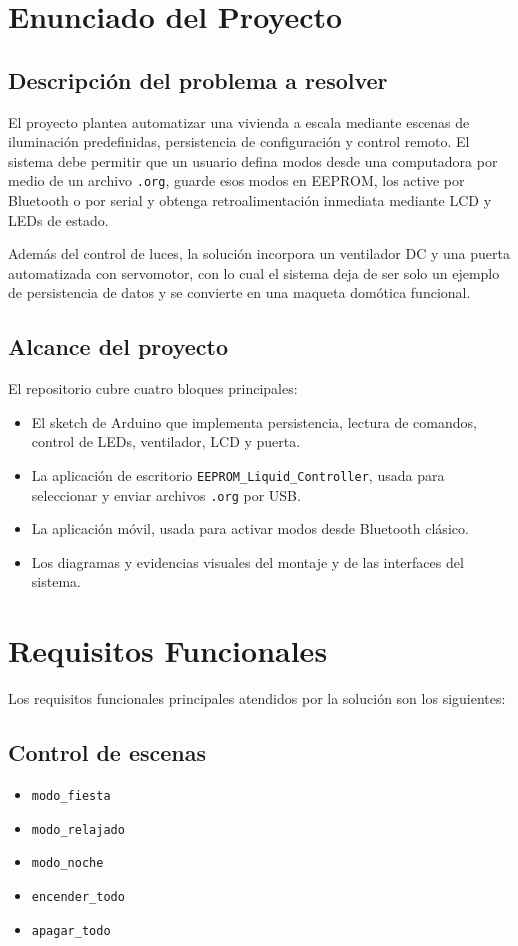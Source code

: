 \documentclass[12pt,a4paper]{article}
\begin{document}
\section{Enunciado del Proyecto}

\subsection{Descripción del problema a resolver}
El proyecto plantea automatizar una vivienda a escala mediante escenas de iluminación predefinidas, persistencia de configuración y control remoto. El sistema debe permitir que un usuario defina modos desde una computadora por medio de un archivo \texttt{.org}, guarde esos modos en EEPROM, los active por Bluetooth o por serial y obtenga retroalimentación inmediata mediante LCD y LEDs de estado.

Además del control de luces, la solución incorpora un ventilador DC y una puerta automatizada con servomotor, con lo cual el sistema deja de ser solo un ejemplo de persistencia de datos y se convierte en una maqueta domótica funcional.

\subsection{Alcance del proyecto}
El repositorio cubre cuatro bloques principales:
\begin{itemize}[leftmargin=1.2cm]
    \item El sketch de Arduino que implementa persistencia, lectura de comandos, control de LEDs, ventilador, LCD y puerta.
    \item La aplicación de escritorio \texttt{EEPROM\_Liquid\_Controller}, usada para seleccionar y enviar archivos \texttt{.org} por USB.
    \item La aplicación móvil, usada para activar modos desde Bluetooth clásico.
    \item Los diagramas y evidencias visuales del montaje y de las interfaces del sistema.
\end{itemize}

\section{Requisitos Funcionales}
Los requisitos funcionales principales atendidos por la solución son los siguientes:

\subsection{Control de escenas}
\begin{itemize}[leftmargin=1.2cm]
    \item \texttt{modo\_fiesta}
    \item \texttt{modo\_relajado}
    \item \texttt{modo\_noche}
    \item \texttt{encender\_todo}
    \item \texttt{apagar\_todo}
\end{itemize}
\end{document}

